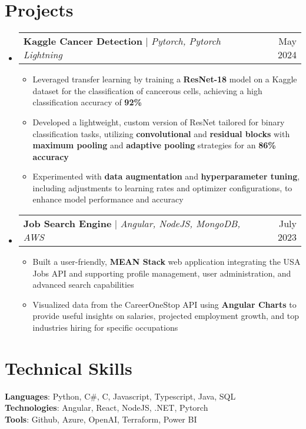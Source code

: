 \documentclass[letterpaper,11pt]{article}
\makeatletter
\newcommand{\resumeItem}[1]{
  \item\small{
    {#1 \vspace{-2pt}}
  }
}
\newcommand{\resumeSubSubheading}[2]{
    \item
    \begin{tabular*}{0.97\textwidth}{l@{\extracolsep{\fill}}r}
      \textit{\small#1} & \textit{\small #2} \\
    \end{tabular*}\vspace{-7pt}
}
\newcommand{\resumeProjectHeading}[2]{
    \item
    \begin{tabular*}{0.97\textwidth}{l@{\extracolsep{\fill}}r}
      \small#1 & #2 \\
    \end{tabular*}\vspace{-7pt}
}
\newcommand{\resumeSubHeadingListStart}{\begin{itemize}[leftmargin=0.15in, label={}]}
\newcommand{\resumeSubHeadingListEnd}{\end{itemize}}
\newcommand{\resumeItemListStart}{\begin{itemize}}
\newcommand{\resumeItemListEnd}{\end{itemize}\vspace{-5pt}}
\makeatother
\begin{document}

\section{Projects}
    \resumeSubHeadingListStart         
    \resumeProjectHeading
    {\textbf{Kaggle Cancer Detection} $|$ \emph{Pytorch, Pytorch Lightning}} {May 2024}
      \resumeItemListStart
        \resumeItem{Leveraged transfer learning by training a \textbf{ResNet-18} model on a Kaggle dataset for the classification of cancerous cells, achieving a high classification accuracy of \textbf{92\%}}
        \resumeItem{Developed a lightweight, custom version of ResNet tailored for binary classification tasks, utilizing \textbf{convolutional} and \textbf{residual blocks} with \textbf{maximum pooling} and \textbf{adaptive pooling} strategies for an \textbf{86\% accuracy}}
        \resumeItem{Experimented with \textbf{data augmentation} and \textbf{hyperparameter tuning}, including adjustments to learning rates and optimizer configurations, to enhance model performance and accuracy}
      \resumeItemListEnd
    
    \resumeProjectHeading
      {\textbf{Job Search Engine} $|$ \emph{Angular, NodeJS, MongoDB, AWS}}{July 2023}
      \resumeItemListStart
        \resumeItem{Built a user-friendly, \textbf{MEAN Stack} web application integrating the USA Jobs API and supporting profile management, user administration, and advanced search capabilities}
        \resumeItem{Visualized data from the CareerOneStop API using \textbf{Angular Charts} to provide useful insights on salaries, projected employment growth, and top industries hiring for specific occupations}
      \resumeItemListEnd
      \resumeSubHeadingListEnd

\section{Technical Skills}
  \begin{itemize}[leftmargin=0.15in, label={}]
    \small{\item{
    {\textbf{Languages}: Python, C\#, C, Javascript, Typescript, Java, SQL}\\
    {\textbf{Technologies}: Angular, React, NodeJS, .NET, Pytorch}\\
    {\textbf{Tools}: Github, Azure, OpenAI, Terraform, Power BI}}}
\end{itemize}
\end{document}
